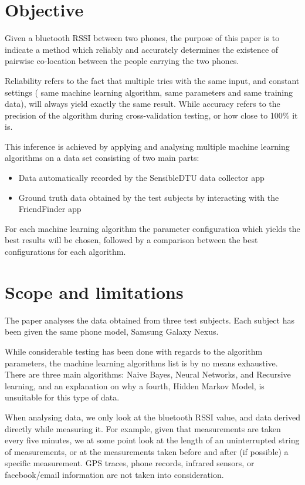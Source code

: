  
\section{Objective}

Given a bluetooth RSSI between two phones, the purpose of this paper is to indicate a method which reliably and accurately determines the existence of pairwise co-location between the people carrying the two phones.

Reliability refers to the fact that multiple tries with the same input, and constant settings ( same machine learning algorithm, same parameters and same training data), will always yield exactly the same result. While accuracy refers to the precision of the algorithm during cross-validation testing, or how close to 100\% it is. 
 
This inference is achieved by applying and analysing multiple machine learning algorithms on a data set consisting of two main parts:
\begin{itemize}
  \item Data automatically recorded by the SensibleDTU data collector app \cite{Stopczynski}
  \item Ground truth data obtained by the test subjects by interacting with the FriendFinder app
\end{itemize}

For each machine learning algorithm the parameter configuration which yields the best results will be chosen, followed by a comparison between the best configurations for each algorithm.      

\section{Scope and limitations}

The paper analyses the data obtained from three test subjects. Each subject has been given the same phone model, Samsung Galaxy Nexus.

While considerable testing has been done with regards to the algorithm parameters, the machine learning algorithms list is by no means exhaustive. There are three main algorithms: Naive Bayes, Neural Networks, and Recursive learning, and an explanation on why a fourth, Hidden Markov Model, is unsuitable for this type of data. 

When analysing data, we only look at the bluetooth RSSI value, and data derived directly while measuring it. For example, given that measurements are taken every five minutes, we at some point look at the length of an uninterrupted string of measurements, or at the measurements taken before and after (if possible) a specific measurement. GPS traces, phone records, infrared sensors, or facebook/email information are not taken into consideration.

